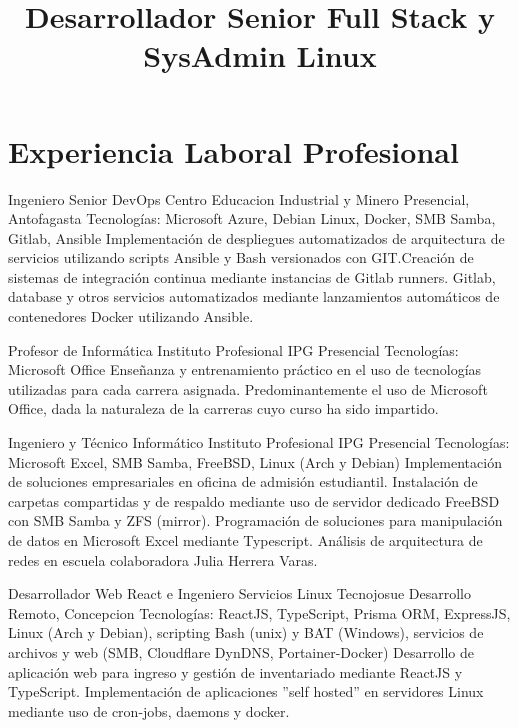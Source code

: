 \documentclass[draft,color,12pt,letterpaper,sans]{moderncv}
\title {Desarrollador Senior Full Stack y SysAdmin Linux}
\begin{document}
\makecvtitle %

\section{Experiencia Laboral Profesional}

{Ingeniero Senior DevOps}
{Centro Educacion Industrial y Minero}
{\newline Presencial, Antofagasta}
{\newline Tecnologías: Microsoft Azure, Debian Linux, Docker, SMB Samba, Gitlab, Ansible}
{Implementación de despliegues automatizados de arquitectura de servicios utilizando scripts Ansible y Bash versionados con GIT.\newline Creación de sistemas de integración continua mediante instancias de Gitlab runners. Gitlab, database y otros servicios automatizados mediante lanzamientos automáticos de contenedores Docker utilizando Ansible.\newline}


{Profesor de Informática}
{Instituto Profesional IPG}
{\newline Presencial}
{\newline Tecnologías: Microsoft Office}
{Enseñanza y entrenamiento práctico en el uso de tecnologías utilizadas para cada carrera asignada. Predominantemente el uso de Microsoft Office, dada la naturaleza de la carreras cuyo curso ha sido impartido.\newline}

{Ingeniero y Técnico Informático}
{Instituto Profesional IPG}
{\newline Presencial}
{\newline Tecnologías: Microsoft Excel, SMB Samba, FreeBSD, Linux (Arch y Debian)}
{Implementación de soluciones empresariales en oficina de  admisión estudiantil. Instalación de carpetas compartidas y de respaldo mediante uso de servidor dedicado FreeBSD con SMB Samba y ZFS (mirror). Programación de soluciones para manipulación de datos en Microsoft Excel mediante Typescript. Análisis de arquitectura de redes en escuela colaboradora Julia Herrera Varas.\newline}

{Desarrollador Web React e Ingeniero Servicios Linux}
{Tecnojosue}
{\newline Desarrollo Remoto, Concepcion}
{\newline Tecnologías:  ReactJS, TypeScript, Prisma ORM, ExpressJS, Linux (Arch y Debian), scripting Bash (unix) y BAT (Windows), servicios de archivos y web (SMB, Cloudflare DynDNS, Portainer-Docker)}
{Desarrollo de aplicación web para ingreso y gestión de inventariado mediante ReactJS y TypeScript. Implementación de aplicaciones ”self hosted” en servidores Linux mediante uso de cron-jobs, daemons y docker.\newline}
\end{document}
